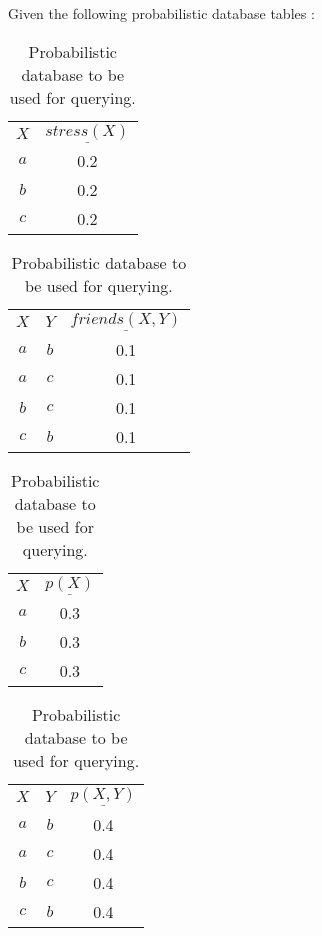 


\noindent Given the following probabilistic database tables :

\begin{table}[h]

	\centering
	
	\begin{subtable}{.2\linewidth}{
	\centering
	\begin{tabular}{c|c}
		$X$ & $\underline{stress(X)}$\\
		$a$ & 0.2\\
		$b$ & 0.2\\
		$c$ & 0.2
	\end{tabular}}
	\label{tab:1a}
	\end{subtable}
	\begin{subtable}{.25\linewidth}{
	\centering
	\begin{tabular}{cc|c}
		$X$ & $Y$ & $\underline{friends(X,Y)}$\\
		$a$ & $b$ & 0.1\\
		$a$ & $c$ & 0.1\\
		$b$ & $c$ & 0.1\\
		$c$ & $b$ & 0.1\\
	\end{tabular}}
	\label{tab:2a}
	\end{subtable}
	\begin{subtable}{.2\linewidth}{
	\centering
	\begin{tabular}{c|c}
		$X$ & $\underline{p(X)}$\\
		$a$ & 0.3\\
		$b$ & 0.3\\
		$c$ & 0.3\\
	\end{tabular}}
	\label{tab:3a}
	\end{subtable}
	\begin{subtable}{.2\linewidth}{
	\centering
	\begin{tabular}{cc|c}
		$X$ & $Y$ & $\underline{p(X,Y)}$\\
		$a$ & $b$ & 0.4\\
		$a$ & $c$ & 0.4\\
		$b$ & $c$ & 0.4\\
		$c$ & $b$ & 0.4\\
	\end{tabular}}
	\label{tab:4a}
	\end{subtable}

	\caption{Probabilistic database to be used for querying.}\label{tab:probdata}

\end{table}

